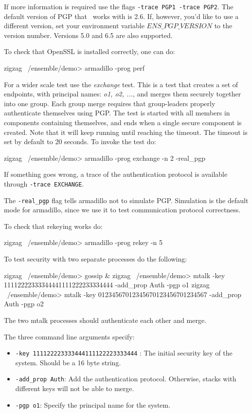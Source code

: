 If more information is required use the flags {\tt -trace PGP1 -trace PGP2}.
The default version of PGP that \ensemble\ works with is 2.6. If,
however, you'd like to use a different version, set your environment
variable $ENS\_PGP\_VERSION$ to the version number. Versions 5.0 and
6.5 are also supported. 

To check that OpenSSL is installed correctly, one can do:
\begin{codebox}
zigzag ~/ensemble/demo> armadillo -prog perf
\end{codebox}

For a wider scale test use the {\it exchange} test. This is a test
that creates a set of endpoints, with principal names: {\it o1, o2,
...}, and merges them securely together into one group. Each group
merge requires that group-leaders properly authenticate themselves
using PGP. The test is started with all members in components containing
themselves, and ends when a single secure component is created. 
Note that it will keep running until reaching the timeout. The timeout
is set by default to 20 seconds. 
To invoke the test do:
\begin{codebox}
zigzag ~/ensemble/demo> armadillo -prog exchange -n 2 -real_pgp
\end{codebox}

If something goes wrong, a trace of the authentication protocol is
available through {\tt -trace EXCHANGE}. 

The {\tt -real\_pgp} flag tells armadillo not to simulate PGP. 
Simulation is the default mode for armadillo, since we use it to
test communication protocol correctness. 

To check that rekeying works do: 
\begin{codebox}
zigzag ~/ensemble/demo> armadillo -prog rekey  -n 5
\end{codebox}


To test security with two separate processes do the following:
\begin{codebox}
zigzag ~/ensemble/demo> gossip &
zigzag ~/ensemble/demo> mtalk -key 11112222333344441111222233334444 
                  -add_prop Auth -pgp o1
zigzag ~/ensemble/demo> mtalk -key 01234567012345670123456701234567 
                 -add_prop Auth -pgp o2
\end{codebox}

The two mtalk processes should authenticate each other and merge.

The three command line arguments specify:
\begin{itemize}
\item {\tt -key 111122223333444111122223333444} : The initial security key of the
      system. Should be a 16 byte string.
\item {\tt -add\_prop Auth}: Add the authentication protocol.
      Otherwise, stacks with different keys will not be able to
      merge. 
\item {\tt -pgp o1}: Specify the principal name for the system.
\end{itemize}

